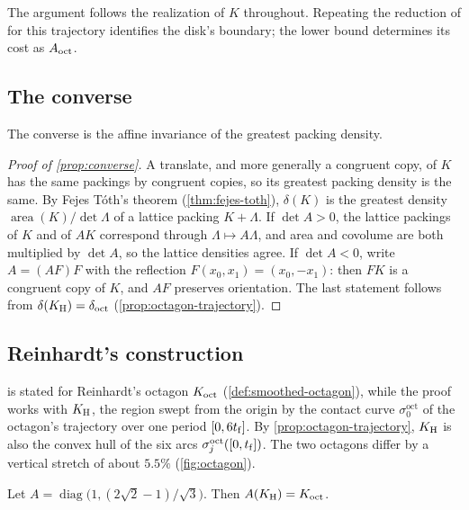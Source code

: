 The argument follows the realization of $K$ throughout. Repeating the reduction of
 for this trajectory identifies the disk's boundary; the
lower bound determines its cost as $A_{\mathrm{oct}}$.

\subsection{The converse}\label{sec:equality-converse}

The converse is the affine invariance of the greatest packing density.

\begin{proof}[Proof of \cref{prop:converse}]
A translate, and more generally a congruent copy, of $K$ has the same packings by congruent copies,
so its greatest packing density is the same. By
Fejes T\'oth's theorem (\cref{thm:fejes-toth}), $\delta(K)$ is the greatest density
$\operatorname{area}(K)/\det\Lambda$ of a lattice packing $K+\Lambda$. If $\det A>0$, the
lattice packings of $K$ and of $AK$ correspond through $\Lambda\mapsto A\Lambda$, and area and
covolume are both multiplied by $\det A$, so the lattice densities agree. If $\det A<0$, write
$A=(AF)F$ with the reflection $F(x_0,x_1)=(x_0,-x_1)$: then $FK$ is a congruent copy of $K$, and
$AF$ preserves orientation. The last statement follows from $\delta(K_{\mathrm{H}})=\delta_{\mathrm{oct}}$
(\cref{prop:octagon-trajectory}).
\end{proof}

\subsection{Reinhardt's construction}\label{sec:equality-construction}

 is stated for Reinhardt's octagon $K_{\mathrm{oct}}$ (\cref{def:smoothed-octagon}), while
the proof works with $K_{\mathrm{H}}$, the region swept from the origin by the contact curve
$\sigma^{\mathrm{oct}}_0$ of the octagon's trajectory over one period $[0,6t_{\mathrm{f}}]$. By
\cref{prop:octagon-trajectory}, $K_{\mathrm{H}}$ is also the convex hull of the six arcs
$\sigma^{\mathrm{oct}}_j([0,t_{\mathrm{f}}])$. The two octagons differ by a vertical stretch of about $5.5\%$
(\cref{fig:octagon}).

\begin{proposition}\label{prop:reinhardt-construction}
Let $A=\operatorname{diag}\bigl(1,(2\sqrt2-1)/\sqrt3\bigr)$. Then $A(K_{\mathrm{H}})=K_{\mathrm{oct}}$.
\end{proposition}

